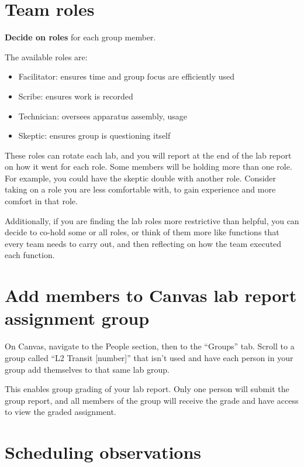 \section{Team roles}

\begin{steps}
	\item \textbf{Decide on roles} for each group member.
\end{steps}

The available roles are:
\begin{itemize}
	\item Facilitator: ensures time and group focus are efficiently used
	\item Scribe: ensures work is recorded
	\item Technician: oversees apparatus assembly, usage
	\item Skeptic: ensures group is questioning itself
\end{itemize}

These roles can rotate each lab, and you will report at the end of the lab report on how it went for each role. Some members will be holding more than one role. For example, you could have the skeptic double with another role. Consider taking on a role you are less comfortable with, to gain experience and more comfort in that role.

Additionally, if you are finding the lab roles more restrictive than helpful, you can decide to co-hold some or all roles, or think of them more like functions that every team needs to carry out, and then reflecting on how the team executed each function.

\section{Add members to Canvas lab report assignment group}

\begin{steps}
	\item On Canvas, navigate to the People section, then to the ``Groups'' tab. Scroll to a group called ``L2 Transit [number]'' that isn't used and have each person in your group add themselves to that same lab group.
\end{steps}

This enables group grading of your lab report. Only one person will submit the group report, and all members of the group will receive the grade and have access to view the graded assignment.

\section{Scheduling observations}

